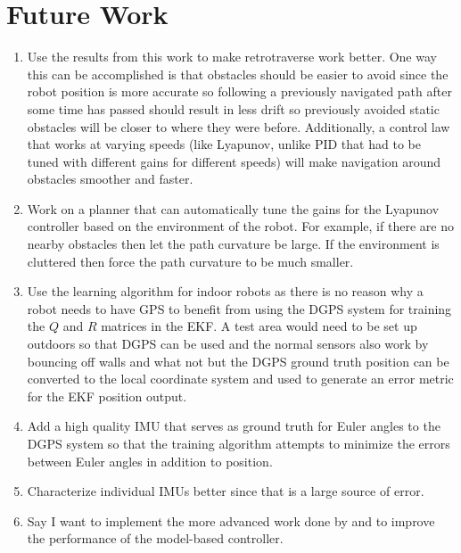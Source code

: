 \chapter{Future Work}
\label{ch:futurework}

\begin{enumerate}
\item Use the results from this work to make retrotraverse work better. One way this can be accomplished is that obstacles should be easier to avoid since the robot position is more accurate so following a previously navigated path after some time has passed should result in less drift so previously avoided static obstacles will be closer to where they were before. Additionally, a control law that works at varying speeds (like Lyapunov, unlike PID that had to be tuned with different gains for different speeds) will make navigation around obstacles smoother and faster.
\item Work on a planner that can automatically tune the gains for the Lyapunov controller based on the environment of the robot. For example, if there are no nearby obstacles then let the path curvature be large. If the environment is cluttered then force the path curvature to be much smaller.
\item Use the learning algorithm for indoor robots as there is no reason why a robot needs to have GPS to benefit from using the DGPS system for training the $Q$ and $R$ matrices in the EKF. A test area would need to be set up outdoors so that DGPS can be used and the normal sensors also work by bouncing off walls and what not but the DGPS ground truth position can be converted to the local coordinate system and used to generate an error metric for the EKF position output.
\item Add a high quality IMU that serves as ground truth for Euler angles to the DGPS system so that the training algorithm attempts to minimize the errors between Euler angles in addition to position.
\item Characterize individual IMUs better since that is a large source of error.
\item Say I want to implement the more advanced work done by \cite{Lapierre06} and \cite{Gulati08} to improve the performance of the model-based controller.
\end{enumerate}
